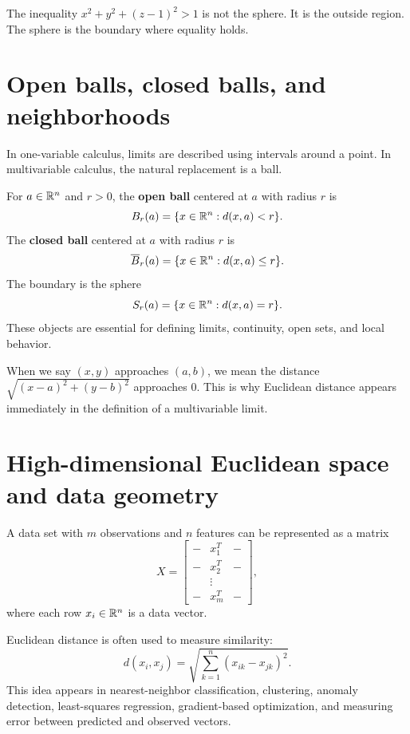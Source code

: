 \begin{warningbox}
The inequality $x^2+y^2+(z-1)^2>1$ is not the sphere. It is the outside region. The sphere is the boundary where equality holds.
\end{warningbox}

\section{Open balls, closed balls, and neighborhoods}

In one-variable calculus, limits are described using intervals around a point. In multivariable calculus, the natural replacement is a ball.

For $a\in\mathbb{R}^n$ and $r>0$, the \textbf{open ball} centered at $a$ with radius $r$ is
\[
  B_r(a)=\{x\in\mathbb{R}^n:d(x,a)<r\}.
\]
The \textbf{closed ball} centered at $a$ with radius $r$ is
\[
  \overline B_r(a)=\{x\in\mathbb{R}^n:d(x,a)\le r\}.
\]
The boundary is the sphere
\[
  S_r(a)=\{x\in\mathbb{R}^n:d(x,a)=r\}.
\]
These objects are essential for defining limits, continuity, open sets, and local behavior.

\begin{notebox}[title={Preview of limits}]
When we say $(x,y)$ approaches $(a,b)$, we mean the distance $\sqrt{(x-a)^2+(y-b)^2}$ approaches $0$. This is why Euclidean distance appears immediately in the definition of a multivariable limit.
\end{notebox}

\section{High-dimensional Euclidean space and data geometry}

A data set with $m$ observations and $n$ features can be represented as a matrix
\[
X=\begin{bmatrix}
- & x_1^T & -\\
- & x_2^T & -\\
& \vdots & \\
- & x_m^T & -
\end{bmatrix},
\]
where each row $x_i\in\mathbb{R}^n$ is a data vector.

Euclidean distance is often used to measure similarity:
\[
  d(x_i,x_j)=\sqrt{\sum_{k=1}^n(x_{ik}-x_{jk})^2}.
\]
This idea appears in nearest-neighbor classification, clustering, anomaly detection, least-squares regression, gradient-based optimization, and measuring error between predicted and observed vectors.


